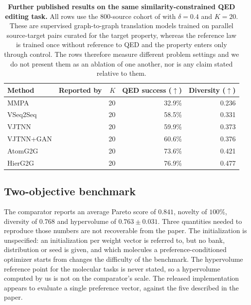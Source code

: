 \begin{table}[!ht]
\centering
{\small
\begin{tabular}{llrrr}
\toprule
Method & Reported by & $K$ & QED success ($\uparrow$) & Diversity ($\uparrow$) \\
\midrule
MMPA      & \citet{jin2019vjtnn}  & 20 & 32.9\% & 0.236 \\
VSeq2Seq  & \citet{jin2019vjtnn}  & 20 & 58.5\% & 0.331 \\
VJTNN     & \citet{jin2019vjtnn}  & 20 & 59.9\% & 0.373 \\
VJTNN+GAN & \citet{jin2019vjtnn}  & 20 & 60.6\% & 0.376 \\
AtomG2G   & \citet{jin2020hierg2g} & 20 & 73.6\% & 0.421 \\
HierG2G   & \citet{jin2020hierg2g} & 20 & 76.9\% & 0.477 \\
\bottomrule
\end{tabular}}
\caption{\small\textbf{Further published results on the same similarity-constrained {QED} editing task.} All rows use the $800$-source cohort of \citet{jin2019vjtnn} with $\delta=0.4$ and $K=20$. These are supervised graph-to-graph translation models trained on parallel source-target pairs curated for the target property, whereas the \method{} reference law is trained once without reference to QED and the property enters only through control. The rows therefore measure different problem settings and we do not present them as an ablation of one another, nor is any \method{} claim stated relative to them.}
\label{tab:qed-historical}
\end{table}

\subsection{Two-objective benchmark}
\label{app:bench-moo}

The comparator reports an average Pareto score of $0.841$, novelty of $100\%$, diversity of $0.768$ and hypervolume of $0.763\pm0.031$. Three quantities needed to reproduce those numbers are not recoverable from the paper. The initialization is unspecified: an initialization per weight vector is referred to, but no bank, distribution or seed is given, and which molecules a preference-conditioned optimizer starts from changes the difficulty of the benchmark. The hypervolume reference point for the molecular tasks is never stated, so a hypervolume computed by us is not on the comparator's scale. The released implementation appears to evaluate a single preference vector, against the five described in the paper.


